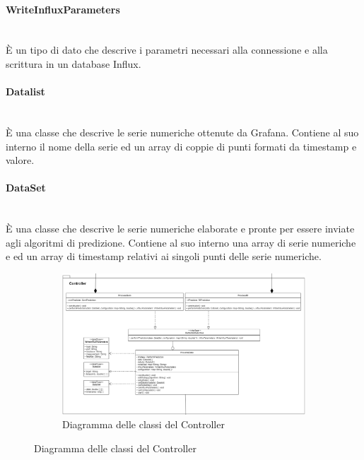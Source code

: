 \paragraph*{WriteInfluxParameters} \mbox{}\\ [1mm]
È un tipo di dato che descrive i parametri necessari alla connessione e alla scrittura in un database Influx.
\paragraph*{Datalist} \mbox{}\\ [1mm]
È una classe che descrive le serie numeriche ottenute da Grafana\glo. Contiene al suo interno il nome della serie ed un array di coppie di punti formati da timestamp e valore.
\paragraph*{DataSet} \mbox{}\\ [1mm]
È una classe che descrive le serie numeriche elaborate e pronte per essere inviate agli algoritmi di predizione. Contiene al suo interno una array di serie numeriche e ed un array di timestamp relativi ai singoli punti delle serie numeriche.
\mbox{}
\begin{landscape}
	\begin{figure}
		\begin{figure} [H]
			\includegraphics[width=\linewidth]{./img/Diagrammi/controller-plug-in.png}
			\caption{Diagramma delle classi del Controller}
		\end{figure}
	\end{figure}
\end{landscape}
